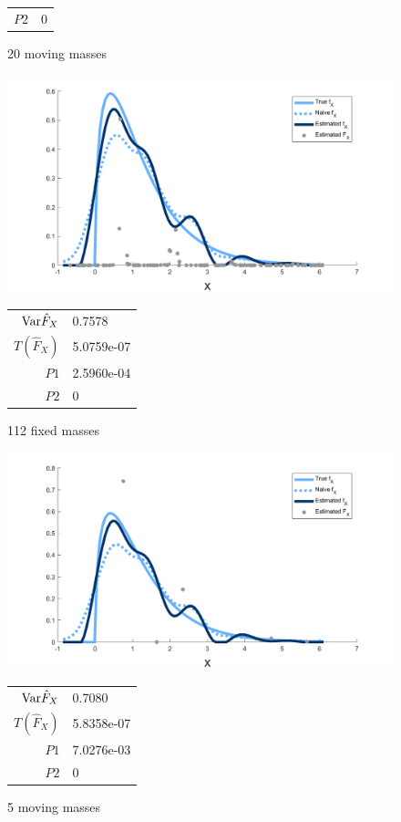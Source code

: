 \begin{figure}
\begin{minipage}{0.5\textwidth}
\begin{tabular}{r l}
			$P2$ & 0
		\end{tabular}
		\caption{20 moving masses}
		\label{fig:moving masses m20 example}
	\end{minipage}
	\begin{minipage}{0.5\textwidth}
	\centering
		\includegraphics[width = \textwidth]{Figures/Deconvolution/fixed_masses_example.png}
		\begin{tabular}{r l}
			$\mathrm{Var} \hat{F}_X$ & 0.7578\\
			$T(\hat{F}_X)$ & 5.0759e-07\\
			$P1$ & 2.5960e-04\\
			$P2$ & 0
		\end{tabular}
		\caption{112 fixed masses}
		\label{fig:fixed masses example}
	\end{minipage}
	\begin{minipage}{0.5\textwidth}
	\centering
		\includegraphics[width = \textwidth]{Figures/Deconvolution/moving_masses_m5_example.png}
		\begin{tabular}{r l}
			$\mathrm{Var} \hat{F}_X$ & 0.7080\\
			$T(\hat{F}_X)$ & 5.8358e-07\\
			$P1$ & 7.0276e-03\\
			$P2$ & 0
		\end{tabular}
		\caption{5 moving masses}
		\label{fig:moving masses m5 example}
	\end{minipage}
\end{figure}

